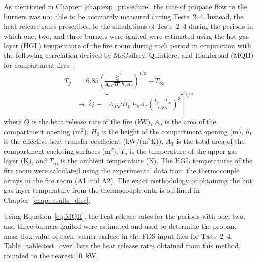 As mentioned in Chapter~\ref{chap:exp_procedure}, the rate of propane flow to the burners was not able to be accurately measured during Tests~2--4. Instead, the heat release rates prescribed to the simulations of Tests~2--4 during the periods in which one, two, and three burners were ignited were estimated using the hot gas layer (HGL) temperature of the fire room during each period in conjunction with the following correlation derived by McCaffrey, Quintiere, and Harkleroad (MQH) for compartment fires~\cite{McCaffery:1}: 
\begin{equation}
\label{eq:MQH}
\begin{split}
  T_g &= 6.85 \left( \frac{\dot{Q}^2}{A_0 \sqrt{H_0} h_k A_T}\right)^{1/3}+T_{\infty} \\
  &\Rightarrow~\dot{Q} = \left[A_0  \sqrt{H_0} h_k A_T \left( \frac{T_g-T_{\infty}}{6.85}\right)^3\right]^{1/2}
\end{split}
\end{equation}
where $\dot{Q}$ is the heat release rate of the fire (kW), $A_0$ is the area of the compartment opening (m$^2$), $H_0$ is the height of the compartment opening (m), $h_k$ is the effective heat transfer coefficient (kW/(m$^2$K)), $A_T$ is the total area of the compartment enclosing surfaces (m$^2$), $T_g$ is the temperature of the upper gas layer (K), and $T_{\infty}$ is the ambient temperature (K). The HGL temperatures of the fire room were calculated using the experimental data from the thermocouple arrays in the fire room (A1 and A2). The exact methodology of obtaining the hot gas layer temperature from the thermocouple data is outlined in Chapter~\ref{chap:results_disc}. 

Using Equation~\ref{eq:MQH}, the heat release rates for the periods with one, two, and three burners ignited were estimated and used to determine the propane mass flux value of each burner surface in the FDS input files for Tests~2--4. Table~\ref{table:test_over} lists the heat release rates obtained from this method, rounded to the nearest 10~kW.

